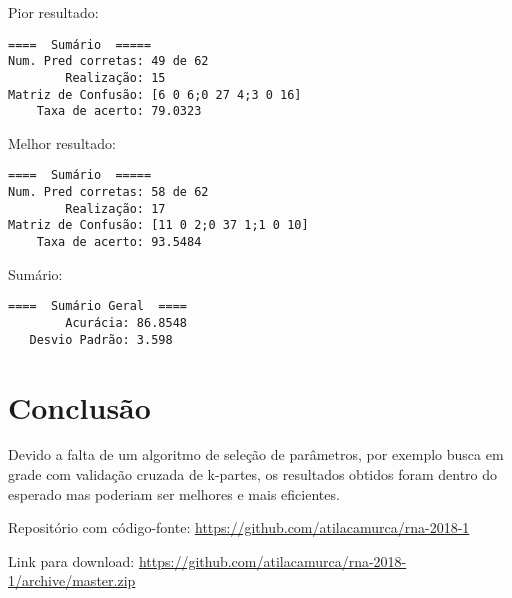 Pior resultado:

\begin{verbatim}
====  Sumário  =====
Num. Pred corretas: 49 de 62
        Realização: 15
Matriz de Confusão: [6 0 6;0 27 4;3 0 16]
    Taxa de acerto: 79.0323
\end{verbatim}

Melhor resultado:

\begin{verbatim}
====  Sumário  =====
Num. Pred corretas: 58 de 62
        Realização: 17
Matriz de Confusão: [11 0 2;0 37 1;1 0 10]
    Taxa de acerto: 93.5484
\end{verbatim}

Sumário:

\begin{verbatim}
====  Sumário Geral  ====
        Acurácia: 86.8548
   Desvio Padrão: 3.598
\end{verbatim}

\section{Conclusão}

Devido a falta de um algoritmo de seleção de parâmetros, por exemplo
busca em grade com validação cruzada de k-partes, os resultados obtidos
foram dentro do esperado mas poderiam ser melhores e mais eficientes.

Repositório com código-fonte:
\url{https://github.com/atilacamurca/rna-2018-1}

Link para download:
\url{https://github.com/atilacamurca/rna-2018-1/archive/master.zip}
